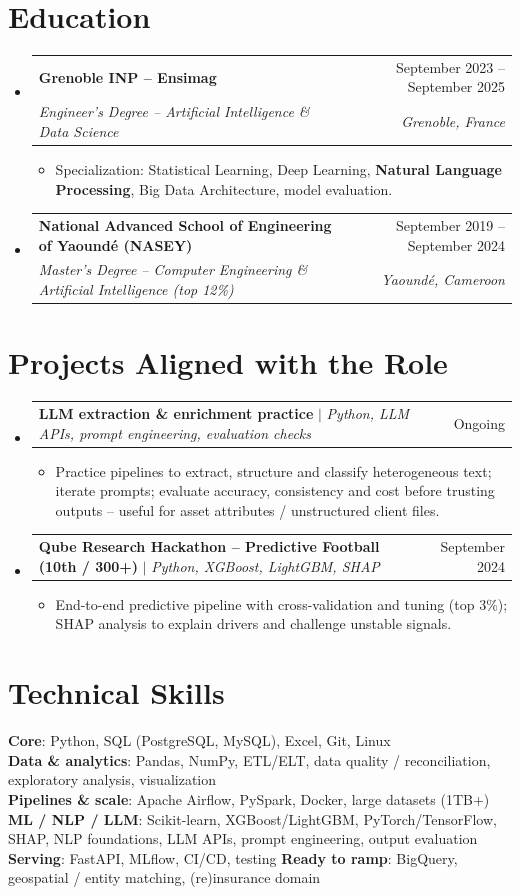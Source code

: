 \documentclass[a4paper,10.5pt]{extarticle}
\makeatletter
\newcommand{\resumeItem}[1]{\item\small{#1}}
\newcommand{\resumeSubheading}[4]{
  \vspace{4pt}\item
  \begin{tabular*}{0.97\textwidth}[t]{l@{\extracolsep{\fill}}r}
    \textbf{#1} & #2 \\
    \textit{\small #3} & \textit{\small #4} \\
  \end{tabular*}\vspace{2pt}
}
\newcommand{\resumeProjectHeading}[2]{
  \vspace{2pt}\item
  \begin{tabular*}{0.97\textwidth}{l@{\extracolsep{\fill}}r}
    \small #1 & #2 \\
  \end{tabular*}\vspace{1pt}
}
\newcommand{\resumeSubHeadingListStart}{\begin{itemize}[leftmargin=0.08in,label={}]}
\newcommand{\resumeSubHeadingListEnd}{\end{itemize}}
\makeatother
\begin{document}
\section{Education}
\resumeSubHeadingListStart
  \resumeSubheading
    {Grenoble INP -- Ensimag}{September 2023 -- September 2025}
    {Engineer's Degree -- Artificial Intelligence \& Data Science}{Grenoble, France}
    \begin{itemize}
      \resumeItem{Specialization: Statistical Learning, Deep Learning, \textbf{Natural Language Processing}, Big Data Architecture, model evaluation.}
    \end{itemize}
  \resumeSubheading
    {National Advanced School of Engineering of Yaound\'e (NASEY)}{September 2019 -- September 2024}
    {Master's Degree -- Computer Engineering \& Artificial Intelligence (top 12\%)}{Yaound\'e, Cameroon}
\resumeSubHeadingListEnd

\section{Projects Aligned with the Role}
\resumeSubHeadingListStart
  \resumeProjectHeading
    {\textbf{LLM extraction \& enrichment practice} $|$ \emph{Python, LLM APIs, prompt engineering, evaluation checks}}{Ongoing}
    \begin{itemize}
      \resumeItem{Practice pipelines to extract, structure and classify heterogeneous text; iterate prompts; evaluate accuracy, consistency and cost before trusting outputs -- useful for asset attributes / unstructured client files.}
    \end{itemize}
  \resumeProjectHeading
    {\textbf{Qube Research Hackathon -- Predictive Football (10th / 300+)} $|$ \emph{Python, XGBoost, LightGBM, SHAP}}{September 2024}
    \begin{itemize}
      \resumeItem{End-to-end predictive pipeline with cross-validation and tuning (top 3\%); SHAP analysis to explain drivers and challenge unstable signals.}
    \end{itemize}
\resumeSubHeadingListEnd

\section{Technical Skills}
\begin{itemize}[leftmargin=0.08in, label={}]
  \small{\item{
    \textbf{Core}: Python, SQL (PostgreSQL, MySQL), Excel, Git, Linux \\[2pt]
    \textbf{Data \& analytics}: Pandas, NumPy, ETL/ELT, data quality / reconciliation, exploratory analysis, visualization \\[2pt]
    \textbf{Pipelines \& scale}: Apache Airflow, PySpark, Docker, large datasets (1TB+) \\[2pt]
    \textbf{ML / NLP / LLM}: Scikit-learn, XGBoost/LightGBM, PyTorch/TensorFlow, SHAP, NLP foundations, LLM APIs, prompt engineering, output evaluation \\[2pt]
    \textbf{Serving}: FastAPI, MLflow, CI/CD, testing \quad
    \textbf{Ready to ramp}: BigQuery, geospatial / entity matching, (re)insurance domain
  }}
\end{itemize}
\end{document}
